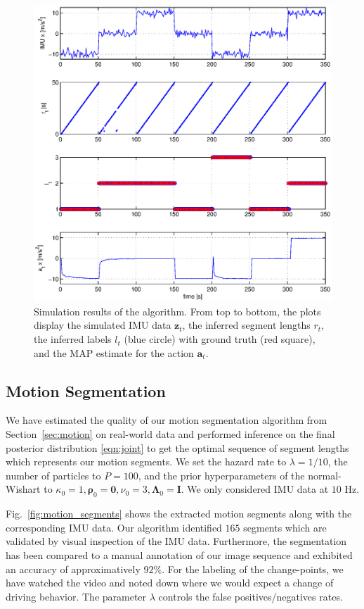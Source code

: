 \begin{figure}[t]
\centering
\includegraphics[width=0.8\columnwidth]{fig/simResult.eps}
\caption{Simulation results of the algorithm. From top to bottom, the
  plots display the simulated IMU data $\mathbf{z}_t$, the inferred
  segment lengths $r_t$, the inferred labels $l_t$ (blue circle) with
  ground truth (red square), and the MAP estimate for the action
  $\mathbf{a}_t$.}
\label{fig:simulation}
\end{figure}

\subsection{Motion Segmentation}
We have estimated the quality of our motion segmentation algorithm
from Section~\ref{sec:motion} on real-world data and performed inference on the
final posterior distribution \eqref{eqn:joint} to get the optimal
sequence of segment lengths which represents our motion segments. We set the
hazard rate to $\lambda=1/10$, the number of particles to $P=100$, and the prior
hyperparameters of the normal-Wishart to $\kappa_0=1,
\boldsymbol{\rho}_0=\mathbf{0},\nu_0=3,\boldsymbol{\Lambda}_0=\mathbf{I}$. We
only considered IMU data at $10$ Hz.

Fig.~\ref{fig:motion_segments} shows the extracted motion segments along with
the corresponding IMU data. Our algorithm identified $165$ segments which are
validated by visual inspection of the IMU data. Furthermore, the segmentation
has been compared to a manual annotation of our image sequence and exhibited an
accuracy of approximatively $92\%$. For the labeling of the change-points, we
have watched the video and noted down where we would expect a change of driving
behavior. The parameter $\lambda$ controls the false positives/negatives rates.

